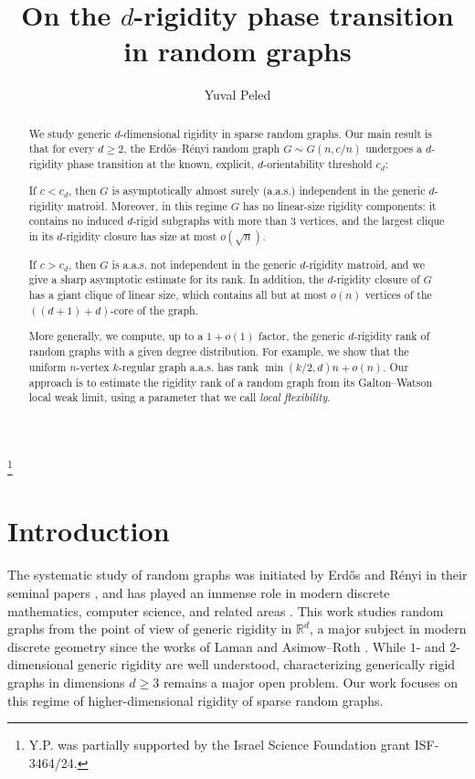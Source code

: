 \documentclass[reqno,english]{amsart}
\numberwithin{equation}{section}
\theoremstyle{definition}{
\newtheorem{example}[theorem]{Example}
\newtheorem{definition}[theorem]{Definition}
\newtheorem*{definition*}{Definition}
\newtheorem{problem}[theorem]{Problem}
\newtheorem{question}[theorem]{Question}
}
\newcommand{\R}{\mathbb R}
\begin{document}
\title{On the $d$-rigidity phase transition in random graphs}

\author{Yuval Peled}
\address{Einstein Institute of Mathematics, The Hebrew University of Jerusalem, Jerusalem, Israel}
\thanks{Y.P. was partially supported by the Israel Science Foundation grant ISF-3464/24.}
\maketitle

\begin{abstract}
We study generic \(d\)-dimensional rigidity in sparse random graphs.
Our main result is that for every $d\ge 2$, the Erd\H{o}s--R\'enyi random graph
\(G\sim G(n,c/n)\) undergoes a \(d\)-rigidity phase transition at the known, explicit, \(d\)-orientability threshold \(c_d\):


If \(c<c_d\), then $G$ is asymptotically almost surely (a.a.s.) independent in the
generic \(d\)-rigidity matroid. Moreover, in this regime \(G\) has no
linear-size rigidity components: it contains no induced \(d\)-rigid
subgraphs with more than \(3\) vertices, and the largest clique in its
\(d\)-rigidity closure has size at most \(o(\sqrt n)\). 

If \(c>c_d\),
then $G$ is a.a.s. not independent in the generic \(d\)-rigidity matroid, and we give a sharp asymptotic estimate for its rank. In addition, the \(d\)-rigidity closure of $G$ has a giant clique of linear
size, which 
contains all but at most \(o(n)\) vertices of the \(((d+1)+d)\)-core of the graph.

More generally, we compute, up to a \(1+o(1)\) factor, the generic
\(d\)-rigidity rank of random graphs with a given degree distribution. For
example, we show that the uniform \(n\)-vertex \(k\)-regular graph a.a.s. has rank $\min(k/2,d)n+o(n).$
Our approach  is to estimate the rigidity rank of a random graph
from its Galton--Watson local weak limit, using a parameter that we call
{\em local flexibility}.

\end{abstract}


\section{Introduction}\label{sec:intro}
The systematic study of random graphs was initiated by Erd\H{o}s and
R\'enyi in their seminal papers
\cite{ErdosRenyi1959,ErdosRenyi1960}, and has played an immense role in
modern discrete mathematics, computer science, and related areas
\cite{BollobasRandomGraphs,JansonLuczakRucinskiRandomGraphs,FriezeBook}.
This work studies random graphs from the point of view of generic
rigidity in \(\R^d\), a major subject in modern discrete geometry since the works of Laman \cite{Laman1970} and Asimow--Roth
\cite{AsimowRoth1978,AsimowRoth1979}. While \(1\)- and \(2\)-dimensional
generic rigidity are well understood, characterizing generically rigid
graphs in dimensions \(d\ge 3\) remains a major open problem. Our work focuses on this regime of higher-dimensional rigidity of sparse random graphs.
\end{document}

